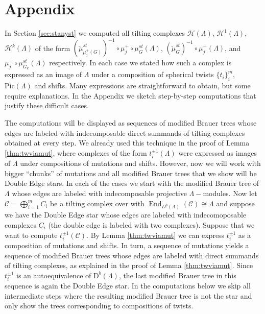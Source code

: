\documentclass[12pt]{amsart}
\theoremstyle{plain}
\theoremstyle{remark}
\theoremstyle{definition}
\newcommand{\End}{\mathop{\mathrm{End}}\nolimits}
\newcommand{\Pic}{{\mathrm{Pic}}}
\newcommand{\D}{{\mathrm{D}}}
\begin{document}
 \section{Appendix}\label{sec:app} 
In Section \ref{sec:stanyst} we computed all tilting complexes $\mathcal{H}(\Lambda)$, $\mathcal{H}^1(\Lambda)$, $\mathcal{H}^k(\Lambda)$ of the form $(\widetilde{\mu}_{\mu_j^+(G)}^{st})^{-1} \circ \mu_j^+ \circ \mu_G^{st}(\Lambda)$, $(\widetilde{\mu}_{G}^{st})^{-1} \circ \mu_{j}^+(\Lambda)$, and $\mu_{j}^+ \circ \mu_{G_{k}}^{st}(\Lambda)$ respectively. In each case we stated how such a complex is expressed as an image of $\Lambda$ under a composition of spherical twists $\{t_i\}_{i}^m$, $\Pic(\Lambda)$ and shifts. Many expressions are straightforward to obtain, but some require explanations. In the Appendix we sketch step-by-step computations that justify these difficult cases. 


The computations will be displayed as sequences of modified Brauer trees whose edges are labeled with indecomposable direct summands of tilting complexes obtained at every step. We already used this technique in the proof of Lemma \ref{thm:twviamut}, where complexes of the form $t_i^{\pm1}(\Lambda)$ were expressed as images of $\Lambda$ under compositions of mutations and shifts. However, now we will work with bigger ``chunks'' of mutations and all modified Brauer trees that we show will be Double Edge stars. In each of the cases we start with the modified Brauer tree of $\Lambda$ whose edges are labeled with indecomposable projective $\Lambda-$modules. Now let $\mathcal{C} = \bigoplus_{i=1}^m C_i$ be a tilting complex over with $\End_{D^b(\Lambda)}(\mathcal{C}) \cong \Lambda$ and suppose we have the Double Edge star whose edges are labeled with indecomoposable complexes $C_i$ (the double edge is labeled with two complexes). Suppose that we want to compute $t_i^{\pm1}(\mathcal{C})$. By Lemma \ref{thm:twviamut} we can express $t_i^{\pm1}$ as a composition of mutations and shifts. In turn, a sequence of mutations yields a sequence of modified Brauer trees whose edges are labeled with direct summands of tilting complexes, as explained in the proof of Lemma \ref{thm:twviamut}. Since $t_i^{\pm 1}$ is an autoequivalence of $\D^b(\Lambda)$, the last modified Brauer tree in this sequence is again the Double Edge star. In the computations below we skip all intermediate steps where the resulting modified Brauer tree is not the star and only show the trees corresponding to compositions of twists.
\end{document}
